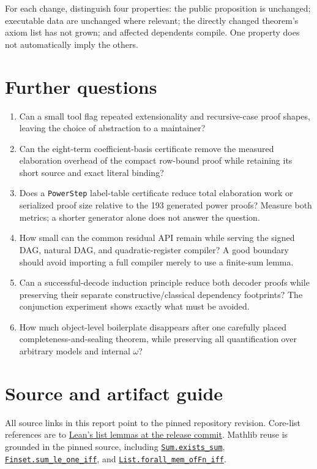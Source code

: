 \documentclass[11pt,letterpaper]{article}
\begin{document}
For each change, distinguish four properties: the public proposition is
unchanged; executable data are unchanged where relevant; the directly
changed theorem's axiom list has not grown; and affected dependents compile.
One property does not automatically imply the others.

\section{Further questions}

\begin{enumerate}
\item Can a small tool flag repeated extensionality and recursive-case
proof shapes, leaving the choice of abstraction to a maintainer?
\item Can the eight-term coefficient-basis certificate remove the measured elaboration overhead of the compact row-bound proof while retaining its short source and exact literal binding?
\item Does a \texttt{PowerStep} label-table certificate reduce total
elaboration work or serialized proof size relative to the 193 generated
power proofs? Measure both metrics; a shorter generator alone does not
answer the question.
\item How small can the common residual API remain while serving the
signed DAG, natural DAG, and quadratic-register compiler? A good boundary
should avoid importing a full compiler merely to use a finite-sum lemma.
\item Can a successful-decode induction principle reduce both decoder
proofs while preserving their separate constructive/classical dependency
footprints? The conjunction experiment shows exactly what must be avoided.
\item How much object-level boilerplate disappears after one carefully
placed completeness-and-sealing theorem, while preserving all quantification
over arbitrary models and internal $\omega$?
\end{enumerate}

\appendix
\section{Source and artifact guide}

All source links in this report point to the pinned repository revision.
Core-list references are to
\href{https://github.com/leanprover/lean4/blob/8c9756b28d64dab099da31a4c09229a9e6a2ef35/src/Init/Data/List/Lemmas.lean}{Lean's list lemmas at the release commit}.
Mathlib reuse is grounded in the pinned source, including
\href{https://github.com/leanprover-community/mathlib4/blob/81a5d257c8e410db227a6665ed08f64fea08e997/Mathlib/Data/Sum/Basic.lean}{\texttt{Sum.exists\_sum}},
\href{https://github.com/leanprover-community/mathlib4/blob/81a5d257c8e410db227a6665ed08f64fea08e997/Mathlib/Algebra/Order/BigOperators/Group/Finset.lean}{\texttt{Finset.sum\_le\_one\_iff}}, and
\href{https://github.com/leanprover-community/mathlib4/blob/81a5d257c8e410db227a6665ed08f64fea08e997/Mathlib/Data/List/OfFn.lean}{\texttt{List.forall\_mem\_ofFn\_iff}}.
\end{document}
